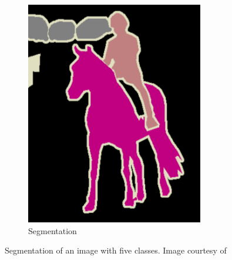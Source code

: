 \begin{figure}[h]
\begin{subfigure}{0.26\textwidth}
                \includegraphics[width=\textwidth]{plots/segmentationTruth.png}
		\caption{Segmentation}
        \end{subfigure}
	\caption[Segmentation of an image]{Segmentation of an image with five classes. Image courtesy of~\cite{Long2015}}
	\label{fig:imageSegmentation}
\end{figure}


